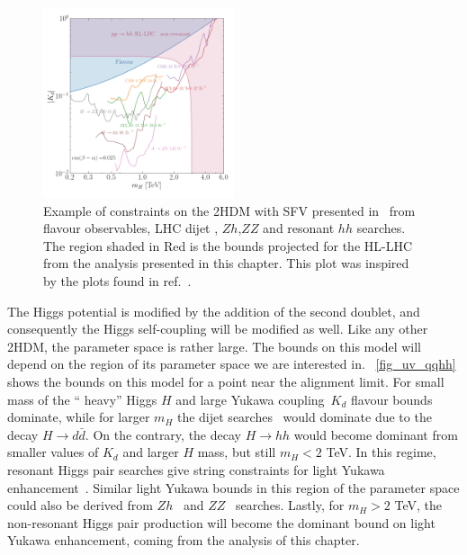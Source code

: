 \begin{figure}[!t]
	\centering
	\includegraphics[width = 0.5\textwidth]{./fig/2HDM-bound_full}
    \vspace{-0.5 cm}
	\caption{Example of constraints on the 2HDM with SFV presented in~\cite{Egana-Ugrinovic:2019dqu,Egana-Ugrinovic:2021uew} from flavour observables, LHC dijet , $Zh$,$ZZ$ and resonant $hh$ searches. The region shaded in Red is the bounds projected for the HL-LHC from the analysis presented in this chapter. This plot was inspired by the plots found in ref.~\cite{Egana-Ugrinovic:2021uew}. } %
	\label{fig_uv_qqhh}
\end{figure}
The Higgs potential is modified by the addition of the second doublet, and consequently the Higgs self-coupling will be modified as well.  Like any other 2HDM, the parameter space is rather large. The bounds on this model will depend on the region of its parameter space we are interested in.  ~\autoref{fig_uv_qqhh} shows the bounds on this model for a point near the alignment limit. For small mass of the `` heavy'' Higgs $H$ and large Yukawa coupling~$K_d$ flavour bounds dominate, while for larger $m_H$ the dijet searches~\cite{Aaboud:2019zxd,Aad:2019hjw,Sirunyan:2019vgj}  would dominate due to the decay $ H \to d \bar d$.  On the contrary, the decay $ H \to hh$ would become dominant from smaller values of $K_d$ and larger $H$ mass, but still $ m_H < 2$ TeV. In this regime, resonant Higgs pair searches give string constraints for light Yukawa enhancement~\cite{Sirunyan:2018ayu, Aad:2019uzh}. Similar  light Yukawa bounds in this region of the parameter space could also be derived from  $Zh$~\cite{ATLAS:2020pgp} and $ZZ$~\cite{Aad:2020fpj, Sirunyan:2018qlb} searches.  Lastly, for $ m_H > 2$ TeV, the non-resonant Higgs pair production will become the dominant bound on light Yukawa enhancement, coming from the analysis of this chapter.  


